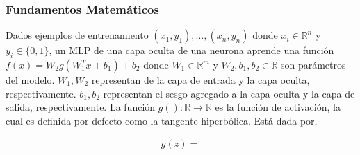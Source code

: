\subsubsection{Fundamentos Matemáticos}
  Dados ejemplos de entrenamiento $(x_{1}, y_{1}), \dots, (x_{n}, y_{n})$
  donde $x_{i} \in \mathbb{R}^{n}$ y $y_{i} \in \{0,1\}$, un MLP de una capa oculta
  de una neurona aprende una función $f(x) = W_{2}g(W_{1}^{T} x + b_{1}) + b_{2}$
  donde $W_{1} \in \mathbb{R}^{m}$ y $W_{2}, b_{1}, b_{2} \in \mathbb{R}$ son
  parámetros del modelo. $W_{1}, W_{2}$ representan de la capa de entrada y la
  capa oculta, respectivamente. $b_{1}, b_{2}$ representan el sesgo agregado a
  la capa oculta y la capa de salida, respectivamente. La función
  $g(): \mathbb{R} \rightarrow \mathbb{R}$ es la función de activación, la cual
  es definida por defecto como la tangente hiperbólica. Está dada por,

\begin{align}
  g(z) =
\end{align}




